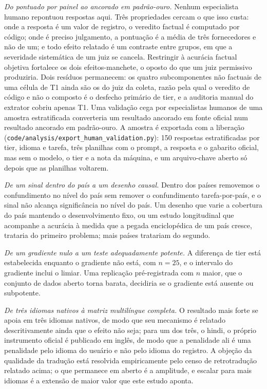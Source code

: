 \emph{Do pontuado por painel ao ancorado em padrão-ouro.} Nenhum especialista
humano repontuou respostas aqui. Três propriedades cercam o que isso custa:
onde a resposta é um valor de registro, o veredito factual é computado por
código; onde é preciso julgamento, a pontuação é a média de três fornecedores
e não de um; e todo efeito relatado é um contraste entre grupos, em que a
severidade sistemática de um juiz se cancela. Restringir à acurácia factual
objetiva fortalece os dois efeitos-manchete, o oposto do que um juiz
permissivo produziria. Dois resíduos permanecem: os quatro subcomponentes não
factuais de uma célula de T1 ainda são os do juiz da coleta, razão pela qual o
veredito de código e não o composto é o desfecho primário de tier, e a
auditoria manual do extrator cobriu apenas T1. Uma validação cega por
especialistas humanos de uma amostra estratificada converteria um resultado
ancorado em fonte oficial num resultado ancorado em padrão-ouro. A amostra é
exportada com a liberação (\texttt{code/analysis/export\_human\_validation.py}):
150 respostas estratificadas por tier, idioma e tarefa, três planilhas com o
prompt, a resposta e o gabarito oficial, mas sem o modelo, o tier e a nota da
máquina, e um arquivo-chave aberto só depois que as planilhas voltarem.

\emph{De um sinal dentro do país a um desenho causal.} Dentro dos países
removemos o confundimento no nível do país sem remover o confundimento
tarefa-por-país, e o sinal não alcança significância no nível do país. Um
desenho que varie a cobertura do país mantendo o desenvolvimento fixo, ou um
estudo longitudinal que acompanhe a acurácia à medida que a pegada
enciclopédica de um país cresce, trataria do primeiro problema; mais países
tratariam do segundo.

\emph{De um gradiente nulo a um teste adequadamente potente.} A diferença de
tier está estabelecida enquanto o gradiente não está, com $n=25$, e o intervalo
do gradiente inclui o limiar. Uma replicação pré-registrada com $n$ maior, que
o conjunto de dados aberto torna barata, decidiria se o gradiente está ausente
ou subpotente.

\emph{De três idiomas nativos à matriz multilíngue completa.} O resultado mais
forte se apoia em três idiomas nativos, de modo que seu mecanismo é relatado
descritivamente ainda que o efeito não seja; para um dos três, o hindi, o
próprio instrumento oficial é publicado em inglês, de modo que a penalidade
ali é uma penalidade pelo idioma do usuário e não pelo idioma do registro. A
objeção da qualidade da tradução está resolvida empiricamente pelo censo de
retrotradução relatado acima; o que permanece em aberto é a amplitude, e
escalar para mais idiomas é a extensão de maior valor que este estudo aponta.

